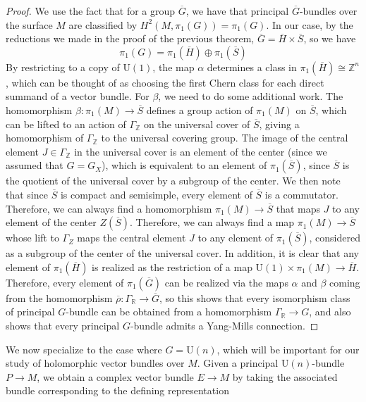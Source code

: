 \documentclass[psamsfonts, 12pt]{amsart}
\theoremstyle{definition}
\theoremstyle{remark}
\newcommand{\R}{\mathbb{R}}
\newcommand{\Z}{\mathbb{Z}}
\begin{document}
\begin{proof}
We use the fact that for a group $\overline{G}$, we have that
principal $\overline{G}$-bundles over the surface $M$ are classified by
$H^2(M, \pi_1(G)) = \pi_1(G)$. In our case, by the reductions we made in the proof
of the previous theorem, $\overline{G} = \overline{H} \times \overline{S}$, so we have
\[
\pi_1(G) = \pi_1(\overline{H}) \oplus \pi_1(\overline{S})
\]
By restricting to a copy of $\mathrm{U}(1)$, the map $\alpha$ determines
a class in $\pi_1(\overline{H}) \cong \Z^n$, which can be thought of as
choosing the first Chern class for each direct summand of a vector bundle.
For $\beta$, we need to do some additional work. The homomorphism
$\beta : \pi_1(M) \to \overline{S}$ defines a group action of $\pi_1(M)$ on
$\overline{S}$, which can be lifted to an action of $\Gamma_\Z$ on the universal
cover of $\overline{S}$, giving a homomorphism of $\Gamma_\Z$ to the universal covering
group. The image of the central element $J \in \Gamma_\Z$ in the
universal cover is an element of the center (since we assumed that $G = G_X$),
which is equivalent to an element of $\pi_1(\overline{S})$, since $\overline{S}$ is
the quotient of the universal cover by a subgroup of the center. We then note
that since $\overline{S}$ is compact and semisimple, every element of $\overline{S}$
is a commutator. Therefore, we can always find a homomorphism
$\pi_1(M) \to \overline{S}$ that maps $J$ to any element of the center
$Z(\overline{S})$. Therefore, we can always find a map $\pi_1(M) \to \overline{S}$
whose lift to $\Gamma_Z$ maps the central element $J$ to any element of
$\pi_1(\overline{S})$, considered as a subgroup of the center of the universal cover.
In addition, it is clear that any element of $\pi_1(\overline{H})$ is realized
as the restriction of a map $\mathrm{U}(1) \times \pi_1(M) \to \overline{H}$. Therefore,
every element of $\pi_1(\overline{G})$ can be realized via the maps
$\alpha$ and $\beta$ coming from the homomorphism
$\overline{\rho} : \Gamma_\R \to \overline{G}$, so this shows that every
isomorphism class of principal $G$-bundle can be obtained from a homomorphism
$\Gamma_\R \to G$, and also shows that every principal $G$-bundle admits a Yang-Mills
connection.
\end{proof}
%
We now specialize to the case where $G = \mathrm{U}(n)$, which will be important for
our study of holomorphic vector bundles over $M$. Given a principal
$\mathrm{U}(n)$-bundle $P \to M$, we obtain a complex vector bundle $E \to M$ by
taking the associated bundle corresponding to the defining representation
\end{document}
